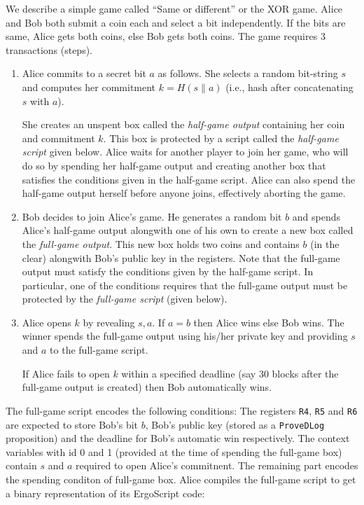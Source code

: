 \documentclass[11pt]{article}
\newcommand{\langname}{ErgoScript\xspace}
\begin{document}
We describe a simple game called ``Same or different'' or the XOR game. Alice and Bob both submit a coin each and select a bit independently. If the bits are same, Alice gets both coins, else Bob gets both coins. The game requires 3 transactions (steps). 
\begin{enumerate}
	\item Alice commits to a secret bit $a$ as follows. She selects a random bit-string $s$ and computes her commitment $k = H(s\|a)$ (i.e., hash after concatenating $s$ with $a$).
	
	She creates an unspent box called the {\em half-game output} containing her coin and commitment $k$. This box is protected by a script called the {\em half-game script}  given below. Alice waits for another player to join her game, who will do so by spending her half-game output and creating another box that satisfies the conditions given in the half-game script. Alice can also spend the half-game output herself before anyone joins, effectively aborting the game. 
	

	\item Bob decides to join Alice's game. He generates a random bit $b$ and spends Alice's half-game output alongwith one of his own to create a new box called the {\em full-game output}. This new box  holds two coins and contains $b$ (in the clear) alongwith Bob's public key in the registers. 
	Note that the full-game output must satisfy the conditions given by the half-game script. In particular, one of the conditions requires that the full-game output must be protected by the {\em full-game script} (given below).
	\item Alice opens $k$ by revealing $s, a$. If $a = b$ then Alice wins else Bob wins. The winner spends the full-game output using his/her private key and providing $s$ and $a$ to the full-game script.

	If Alice fails to open $k$ within a specified deadline (say 30 blocks after the full-game output is created) then Bob automatically wins. 
\end{enumerate}

The full-game script encodes the following conditions: The registers \texttt{R4}, \texttt{R5} and \texttt{R6} are expected to store Bob's bit $b$, Bob's public key (stored as a \texttt{ProveDLog} proposition) and the deadline for Bob's automatic win respectively. The context variables with id 0 and 1 (provided at the time of spending the full-game box) contain $s$ and $a$ required to open Alice's commitnent. The remaining part encodes the spending conditon of full-game box. Alice compiles the full-game script to get a binary representation of its \langname code: 
\end{document}
